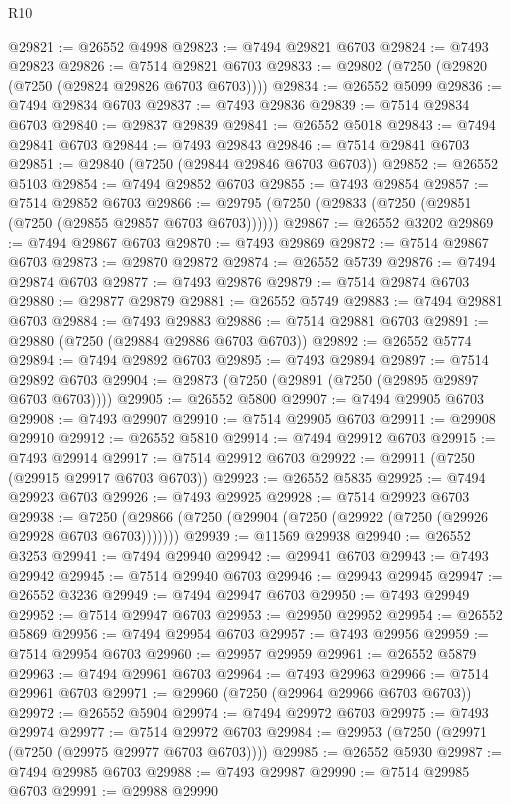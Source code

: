 \begin{lexlean}{R10}
\begin{coremodule}
@29821 := @26552 @4998
@29823 := @7494 @29821 @6703
@29824 := @7493 @29823
@29826 := @7514 @29821 @6703
@29833 := @29802 (@7250 (@29820 (@7250 (@29824 @29826 @6703 @6703))))
@29834 := @26552 @5099
@29836 := @7494 @29834 @6703
@29837 := @7493 @29836
@29839 := @7514 @29834 @6703
@29840 := @29837 @29839
@29841 := @26552 @5018
@29843 := @7494 @29841 @6703
@29844 := @7493 @29843
@29846 := @7514 @29841 @6703
@29851 := @29840 (@7250 (@29844 @29846 @6703 @6703))
@29852 := @26552 @5103
@29854 := @7494 @29852 @6703
@29855 := @7493 @29854
@29857 := @7514 @29852 @6703
@29866 := @29795 (@7250 (@29833 (@7250 (@29851 (@7250 (@29855 @29857 @6703 @6703))))))
@29867 := @26552 @3202
@29869 := @7494 @29867 @6703
@29870 := @7493 @29869
@29872 := @7514 @29867 @6703
@29873 := @29870 @29872
@29874 := @26552 @5739
@29876 := @7494 @29874 @6703
@29877 := @7493 @29876
@29879 := @7514 @29874 @6703
@29880 := @29877 @29879
@29881 := @26552 @5749
@29883 := @7494 @29881 @6703
@29884 := @7493 @29883
@29886 := @7514 @29881 @6703
@29891 := @29880 (@7250 (@29884 @29886 @6703 @6703))
@29892 := @26552 @5774
@29894 := @7494 @29892 @6703
@29895 := @7493 @29894
@29897 := @7514 @29892 @6703
@29904 := @29873 (@7250 (@29891 (@7250 (@29895 @29897 @6703 @6703))))
@29905 := @26552 @5800
@29907 := @7494 @29905 @6703
@29908 := @7493 @29907
@29910 := @7514 @29905 @6703
@29911 := @29908 @29910
@29912 := @26552 @5810
@29914 := @7494 @29912 @6703
@29915 := @7493 @29914
@29917 := @7514 @29912 @6703
@29922 := @29911 (@7250 (@29915 @29917 @6703 @6703))
@29923 := @26552 @5835
@29925 := @7494 @29923 @6703
@29926 := @7493 @29925
@29928 := @7514 @29923 @6703
@29938 := @7250 (@29866 (@7250 (@29904 (@7250 (@29922 (@7250 (@29926 @29928 @6703 @6703)))))))
@29939 := @11569 @29938
@29940 := @26552 @3253
@29941 := @7494 @29940
@29942 := @29941 @6703
@29943 := @7493 @29942
@29945 := @7514 @29940 @6703
@29946 := @29943 @29945
@29947 := @26552 @3236
@29949 := @7494 @29947 @6703
@29950 := @7493 @29949
@29952 := @7514 @29947 @6703
@29953 := @29950 @29952
@29954 := @26552 @5869
@29956 := @7494 @29954 @6703
@29957 := @7493 @29956
@29959 := @7514 @29954 @6703
@29960 := @29957 @29959
@29961 := @26552 @5879
@29963 := @7494 @29961 @6703
@29964 := @7493 @29963
@29966 := @7514 @29961 @6703
@29971 := @29960 (@7250 (@29964 @29966 @6703 @6703))
@29972 := @26552 @5904
@29974 := @7494 @29972 @6703
@29975 := @7493 @29974
@29977 := @7514 @29972 @6703
@29984 := @29953 (@7250 (@29971 (@7250 (@29975 @29977 @6703 @6703))))
@29985 := @26552 @5930
@29987 := @7494 @29985 @6703
@29988 := @7493 @29987
@29990 := @7514 @29985 @6703
@29991 := @29988 @29990

\end{coremodule}
\end{lexlean}
